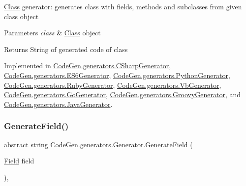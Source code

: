 \mbox{\hyperlink{classCodeGen_1_1generators_1_1Class}{Class}} generator\+: generates class with fields, methods and subclasses from given class object 


\begin{DoxyParams}{Parameters}
{\em class} & \mbox{\hyperlink{classCodeGen_1_1generators_1_1Class}{Class}} object\\
\hline
\end{DoxyParams}
\begin{DoxyReturn}{Returns}
String of generated code of class
\end{DoxyReturn}


Implemented in \mbox{\hyperlink{classCodeGen_1_1generators_1_1CSharpGenerator_ae09fc218c8ddef8f13649ed278e93ff1}{Code\+Gen.\+generators.\+C\+Sharp\+Generator}}, \mbox{\hyperlink{classCodeGen_1_1generators_1_1ES6Generator_a53988e6898a5cf7b926e4c74a5af1703}{Code\+Gen.\+generators.\+E\+S6\+Generator}}, \mbox{\hyperlink{classCodeGen_1_1generators_1_1PythonGenerator_a7ef1629fdf50856e1424ed4fd8be564c}{Code\+Gen.\+generators.\+Python\+Generator}}, \mbox{\hyperlink{classCodeGen_1_1generators_1_1RubyGenerator_a5d54d68890f2fc6c58e297f79647c033}{Code\+Gen.\+generators.\+Ruby\+Generator}}, \mbox{\hyperlink{classCodeGen_1_1generators_1_1VbGenerator_a78dd1bac9e915e214bb6a43b3ebc15b5}{Code\+Gen.\+generators.\+Vb\+Generator}}, \mbox{\hyperlink{classCodeGen_1_1generators_1_1GoGenerator_aacdb59f4942c999f06400f9f92732858}{Code\+Gen.\+generators.\+Go\+Generator}}, \mbox{\hyperlink{classCodeGen_1_1generators_1_1GroovyGenerator_af13381a7be697b1f22cbf39bc0ab0e8d}{Code\+Gen.\+generators.\+Groovy\+Generator}}, and \mbox{\hyperlink{classCodeGen_1_1generators_1_1JavaGenerator_aebc6618c4d20b03195d4dd2a9bd03ffb}{Code\+Gen.\+generators.\+Java\+Generator}}.

\mbox{\label{classCodeGen_1_1generators_1_1Generator_a0d1a48aedbca08c05af734a43739d1c3}} 
\subsubsection{\texorpdfstring{Generate\+Field()}{GenerateField()}}
{\footnotesize\ttfamily abstract string Code\+Gen.\+generators.\+Generator.\+Generate\+Field (\begin{DoxyParamCaption}\item[{\mbox{\hyperlink{classCodeGen_1_1generators_1_1Field}{Field}}}]{field }\end{DoxyParamCaption})\hspace{0.3cm}{\ttfamily [protected]}, {}}



